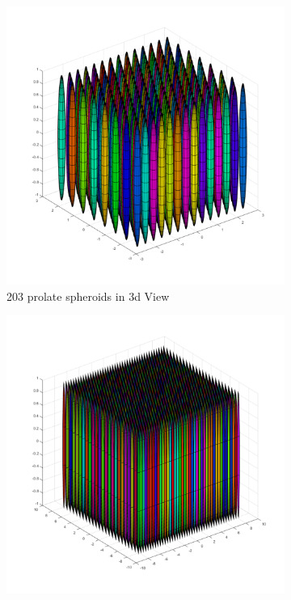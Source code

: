 \begin{figure}[!ht]
        \centering
        \begin{subfigure}[b]{0.475\textwidth}
            \centering
            \includegraphics[width=\textwidth]{Images/Rods/SmallRods3d.pdf}
            \caption[]%
            {{\small 203 prolate spheroids in 3d View}}    
            \label{fig:mean and std of net14}
        \end{subfigure}
        \begin{subfigure}[b]{0.475\textwidth}  
            \centering 
            \includegraphics[width=\textwidth]{Images/Rods/LargeRods3d.pdf}

\end{subfigure}
\end{figure}

